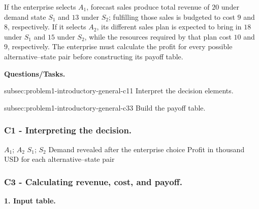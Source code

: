 	If the enterprise selects \(A_1\), forecast sales produce total revenue of \(20\) under demand state \(S_1\) and \(13\) under \(S_2\); fulfilling those sales is budgeted to cost \(9\) and \(8\), respectively. If it selects \(A_2\), its different sales plan is expected to bring in \(18\) under \(S_1\) and \(15\) under \(S_2\), while the resources required by that plan cost \(10\) and \(9\), respectively. The enterprise must calculate the profit for every possible alternative--state pair before constructing its payoff table.

	\textbf{Questions/Tasks.}
	\begin{enumerate}
		\CriterionTask
		{subsec:problem1-introductory-general-c1}{1}
		{Interpret the decision elements.}

		\CriterionTask
		{subsec:problem1-introductory-general-c3}{3}
		{Build the payoff table.}
	\end{enumerate}

	\subsubsection*{C1 - Interpreting the decision.}
	\label{subsec:problem1-introductory-general-c1}

	\DecisionElementsTable
	{\(A_1\); \(A_2\)}
	{\(S_1\); \(S_2\)}
	{Demand revealed after the enterprise choice}
	{Profit in thousand USD for each alternative--state pair}


	\subsubsection*{C3 - Calculating revenue, cost, and payoff.}
	\label{subsec:problem1-introductory-general-c3}

\textbf{1. Input table.}

